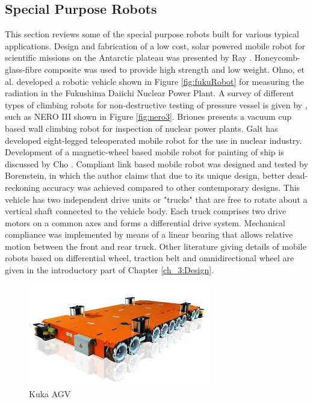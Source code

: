 \subsection{ Special Purpose Robots}
This section reviews some of the special purpose  robots built for various typical applications. 
Design and fabrication of a low cost, solar powered mobile robot for  scientific missions on the Antarctic plateau was presented by Ray  \cite{ray2005design}. Honeycomb-glass-fibre composite was used to provide high strength and low weight. Ohno, et al. \cite{ohno2011robotic}   developed a robotic  vehicle shown in Figure \ref{fig:fukuRobot} for measuring the radiation in the Fukushima Daiichi Nuclear Power Plant. A survey of different types of climbing robots for non-destructive testing of pressure vessel is given by \cite{luk2006tele}, such as NERO III shown in Figure \ref{fig:nero3}.  Briones \cite{briones1994wall} presents a vacuum cup based wall climbing robot for inspection of  nuclear power plants. Galt \cite{galt1997tele} has developed eight-legged teleoperated mobile robot for the use in nuclear industry. Development of a magnetic-wheel based mobile robot for painting of ship is discussed by Cho \cite{cho2013study}. Compliant link based mobile robot was designed and tested by Borenstein\cite{borenstein1995control}, in which the author claims that due to its unique design, better dead-reckoning accuracy was achieved compared to other contemporary designs. This vehicle has two independent drive units or "trucks" that are free to rotate about a vertical shaft connected to the vehicle body. Each truck comprises two drive motors on a common axes and forms a differential drive system. Mechanical compliance was implemented by means of a linear bearing that allows relative motion between the front and rear truck. Other literature giving details of  mobile robots based on   differential wheel, traction belt and omnidirectional wheel are given in the introductory part of Chapter \ref{ch_3:Design}.
\begin{figure}
	\includegraphics{Chapter1/fig/kukaAGV}
	\caption{Kuka AGV} \label{fig:kukaagv}
\end{figure}

